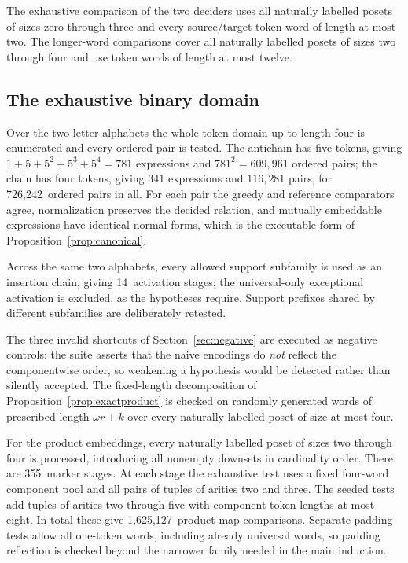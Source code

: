 \documentclass[11pt,a4paper]{article}
\numberwithin{equation}{section}
\theoremstyle{definition}
\theoremstyle{remark}
\newcommand{\ProductChecks}{1,625,127}
\newcommand{\MarkerStages}{355}
\newcommand{\BinaryPairs}{726,242}
\newcommand{\BinaryStages}{14}}
\begin{document}
The exhaustive comparison of the two deciders uses all naturally labelled
posets of sizes zero through three and every source/target token word of
length at most two. The longer-word comparisons cover all naturally
labelled posets of sizes two through four and use token words of length
at most twelve.

\subsection{The exhaustive binary domain}
Over the two-letter alphabets the whole token domain up to length four is
enumerated and every ordered pair is tested. The antichain has five tokens,
giving $1+5+5^2+5^3+5^4=781$ expressions and $781^2=609{,}961$ ordered pairs;
the chain has four tokens, giving $341$ expressions and $116{,}281$ pairs, for
\BinaryPairs\ ordered pairs in all. For each pair the greedy and reference
comparators agree, normalization preserves the decided relation, and
mutually embeddable expressions have identical normal forms, which is the
executable form of Proposition~\ref{prop:canonical}.

Across the same two alphabets, every allowed support subfamily is used as an
insertion chain, giving \BinaryStages\ activation stages; the universal-only
exceptional activation is excluded, as the hypotheses require. Support
prefixes shared by different subfamilies are deliberately retested.

The three invalid shortcuts of Section~\ref{sec:negative} are executed as
negative controls: the suite asserts that the naive encodings do \emph{not}
reflect the componentwise order, so weakening a hypothesis would be detected
rather than silently accepted. The fixed-length decomposition of
Proposition~\ref{prop:exactproduct} is checked on randomly generated words of
prescribed length $\omega r+k$ over every naturally labelled poset of size at
most four.

For the product embeddings, every naturally labelled poset of sizes two
through four is processed, introducing all nonempty downsets in cardinality
order. There are \MarkerStages\ marker stages. At each stage the exhaustive
test uses a fixed four-word component pool and all pairs of tuples of
arities two and three. The seeded tests add tuples of arities two through
five with component token lengths at most eight. In total these give
\ProductChecks\ product-map comparisons. Separate padding tests allow all
one-token words, including already universal words, so padding reflection
is checked beyond the narrower family needed in the main induction.
\end{document}
